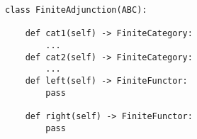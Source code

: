 \begin{verbatim}
class FiniteAdjunction(ABC):

    def cat1(self) -> FiniteCategory:
        ...
    def cat2(self) -> FiniteCategory:
        ...
    def left(self) -> FiniteFunctor:
        pass

    def right(self) -> FiniteFunctor:
        pass
\end{verbatim}